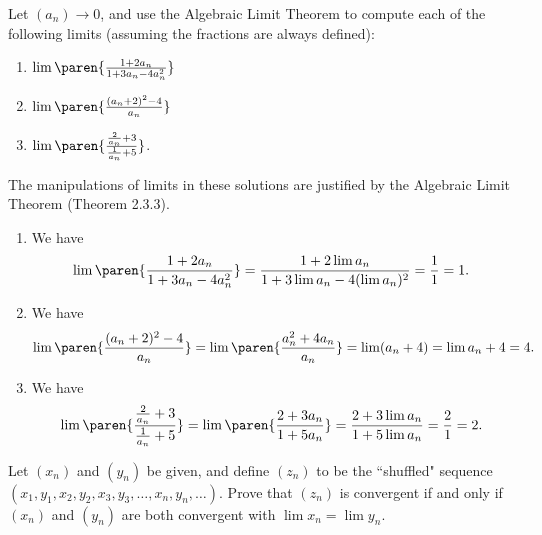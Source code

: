 \documentclass{lew98_solutions}
\begin{document}
\begin{exercise}
\label{ex:2.3.4}
    Let \( (a_n) \to 0 \), and use the Algebraic Limit Theorem to compute each of the following limits (assuming the fractions are always defined):
    \begin{enumerate}
        \item \( \lim \paren{ \frac{1 + 2 a_n}{1 + 3 a_n - 4 a_n^2} } \)

        \item \( \lim \paren{ \frac{(a_n + 2)^2 - 4}{a_n} } \)

        \item \( \lim \paren{ \frac{\frac{2}{a_n} + 3}{\frac{1}{a_n} + 5} } \).
    \end{enumerate}
\end{exercise}

\begin{solution}
    The manipulations of limits in these solutions are justified by the Algebraic Limit Theorem (Theorem 2.3.3).
    \begin{enumerate}
        \item We have
        \[
            \lim \paren{ \frac{1 + 2 a_n}{1 + 3 a_n - 4 a_n^2} } = \frac{1 + 2 \lim a_n}{1 + 3 \lim a_n - 4 (\lim a_n)^2} = \frac{1}{1} = 1.
        \]

        \item We have
        \[
            \lim \paren{ \frac{(a_n + 2)^2 - 4}{a_n} } = \lim \paren{ \frac{a_n^2 + 4 a_n}{a_n} } = \lim (a_n + 4) = \lim a_n + 4 = 4.
        \]

        \item We have
        \[
            \lim \paren{ \frac{\frac{2}{a_n} + 3}{\frac{1}{a_n} + 5} } = \lim \paren{ \frac{2 + 3 a_n}{1 + 5 a_n} } = \frac{2 + 3 \lim a_n}{1 + 5 \lim a_n} = \frac{2}{1} = 2.
        \]
    \end{enumerate}
\end{solution}

\begin{exercise}
\label{ex:2.3.5}
    Let \( (x_n) \) and \( (y_n) \) be given, and define \( (z_n) \) to be the ``shuffled" sequence \( (x_1, y_1, x_2, y_2, x_3, y_3, \ldots, x_n, y_n, \ldots) \). Prove that \( (z_n) \) is convergent if and only if \( (x_n) \) and \( (y_n) \) are both convergent with \( \lim x_n = \lim y_n \).
\end{exercise}
\end{document}
